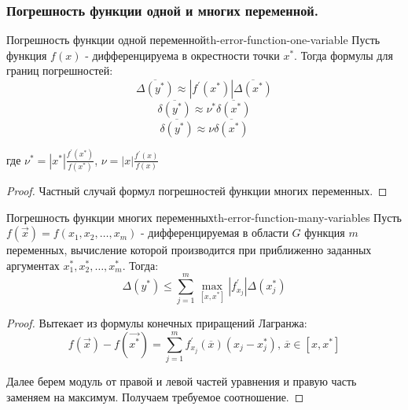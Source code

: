 \documentclass[14pt]{extarticle}
\begin{document}
    \subsubsection{Погрешность функции одной и многих переменной.}

        \begin{theorem}{Погрешность функции одной переменной}{th-error-function-one-variable}
            Пусть функция $f(x)$ - дифференцируема в окрестности точки $x^{*}$. Тогда формулы для границ погрешностей:
            $$\overline{\Delta(y^{*})} \approx |f^{'}(x^{*})|\overline{\Delta(x^{*})}$$
            $$\overline{\delta(y^{*})} \approx \nu^{*}\overline{\delta(x^{*})}$$
            $$\overline{\delta(y^{*})} \approx \nu \overline{\delta(x^{*})}$$
        
            где $\nu^{*} = |x^{*}| \frac{f^{'}(x^{*})}{f(x^{*})}$, $\nu = |x| \frac{f^{'}(x)}{f(x)}$
       
            \begin{proof}
                Частный случай формул погрешностей функции многих переменных.
            \end{proof}
        \end{theorem}

        \begin{theorem}{Погрешность функции многих переменных}{th-error-function-many-variables}
            Пусть $f(\vec{x}) = f(x_{1}, x_{2}, \ldots, x_{m})$ - дифференцируемая в области $G$ функция $m$ переменных, вычисление которой производится при приближенно заданных аргументах $x_{1}^{*}, x_{2}^{*}, \ldots, x_{m}^{*}$. Тогда:
            $$\Delta(y^{*}) \leq \sum_{j=1}^{m} \max_{[x, x^{*}]} |f_{x_{j}}^{'}|\Delta(x_{j}^{*})$$
        
            \begin{proof}
                Вытекает из формулы конечных приращений Лагранжа:\\
                $$f(\vec{x}) - f(\vec{x^{*}}) = \sum_{j=1}^{m} f_{x_{j}}^{'}(\overline{x})(x_{j} - x_{j}^{*}) \text{, } \overline{x} \in [x, x^{*}]$$
                
                Далее берем модуль от правой и левой частей уравнения и правую часть заменяем на максимум. Получаем требуемое соотношение.
            \end{proof}
        \end{theorem}
\end{document}
